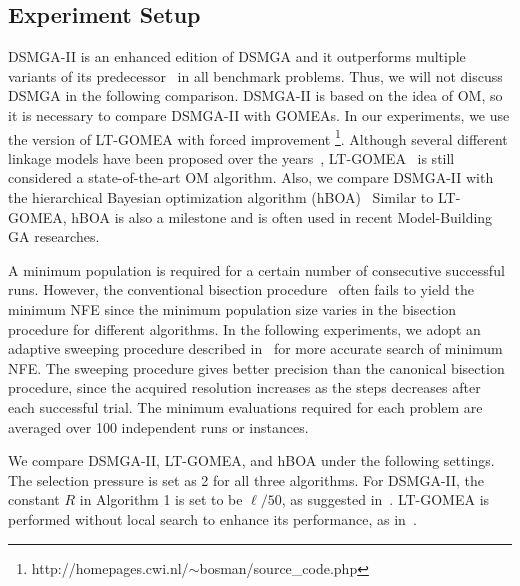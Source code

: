 \subsection{Experiment Setup}
DSMGA-II is an enhanced edition of DSMGA and it outperforms multiple variants of its predecessor~\cite{yu:DSMGA} in all benchmark problems. 
Thus, we will not discuss DSMGA in the following comparison.
DSMGA-II is based on the idea of OM, so it is necessary to compare DSMGA-II with GOMEAs. 
In our experiments, we use the version of LT-GOMEA with forced improvement \footnote{http://homepages.cwi.nl/$\sim$bosman/source\_code.php}.
Although several different linkage models have been proposed over the years~\cite{bosman:robust}, LT-GOMEA~\cite{bosman:LT-GOMEA} is still considered a state-of-the-art OM algorithm.
Also, we compare DSMGA-II with the hierarchical Bayesian optimization algorithm (hBOA)~\cite{pelikan:hBOA}
Similar to LT-GOMEA, hBOA is also a milestone and is often used in recent Model-Building GA researches.


A minimum population is required for a certain number of consecutive successful runs.
However, the conventional bisection procedure~\cite{pelikan:hBOA} often fails to yield the minimum NFE  since the minimum population size varies in the bisection procedure for different algorithms.
In the following experiments, we adopt an adaptive sweeping procedure described in~\cite{hsu:DSMGA2} for more accurate search of minimum NFE.
The sweeping procedure gives better precision than the canonical bisection procedure, since the acquired resolution increases as the steps decreases after each successful trial.
The minimum evaluations required for each problem are averaged over 100 independent runs or instances.

We compare DSMGA-II, LT-GOMEA, and hBOA under the following settings. 
The selection pressure is set as 2 for all three algorithms. 
For DSMGA-II, the constant $R$ in Algorithm 1 is set to be $\ell/50$, as suggested in~\cite{hsu:DSMGA2}.
LT-GOMEA is performed without local search to enhance its performance, as in~\cite{bosman:LT-GOMEA}.




